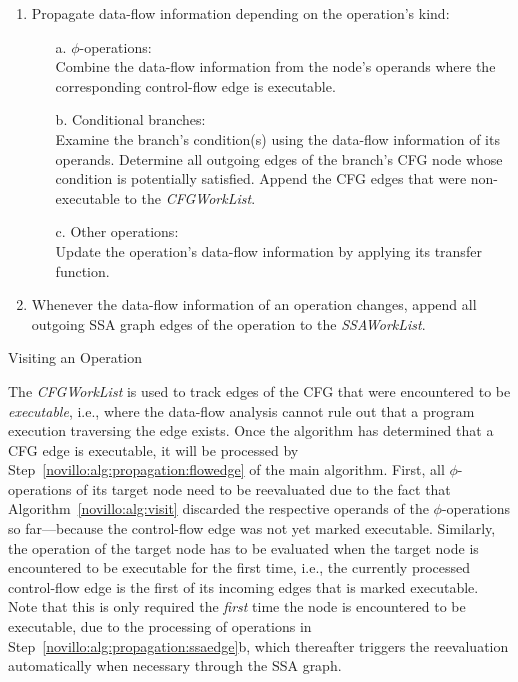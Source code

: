 \begin{algorithm}[t!]
  \begin{enumerate}
    \item Propagate data-flow information depending on the operation's kind:
    \begin{enumerate}
      \vspace{-1.2ex}
      \item[a.] \label{novillo:alg:visit:phi} $\phi$-operations: \\
                Combine the data-flow information from the node's operands where
                the corresponding control-flow edge is executable.
      \item[b.] \label{novillo:alg:visit:branch} Conditional branches: \\
                Examine the branch's condition(s) using the data-flow
                information of its operands. Determine all outgoing edges of the
                branch's CFG node whose condition is potentially satisfied.
                Append the CFG edges that were non-executable to the
                \emph{CFGWorkList}.
      \item[c.] \label{novillo:alg:visit:regular} Other operations:\\
                Update the operation's data-flow information by applying its 
                transfer function.
    \end{enumerate}
    \vspace{-1ex}
    \item Whenever the data-flow information of an operation changes, append all
          outgoing SSA graph edges of the operation to the \emph{SSAWorkList}.
  \end{enumerate}
  \caption{Visiting an Operation}
  \label{novillo:alg:visit}
\end{algorithm}

The \emph{CFGWorkList} is used to track edges of the CFG that were encountered
to be \emph{executable}, i.e., where the data-flow analysis cannot rule out that
a program execution traversing the edge exists. Once the algorithm has
determined that a CFG edge is executable, it will be processed by
Step~\ref{novillo:alg:propagation:flowedge} of the main algorithm. First, all
$\phi$-operations of its target node need to be reevaluated due to the fact that
Algorithm~\ref{novillo:alg:visit} discarded the respective operands of the
$\phi$-operations so far---because the control-flow edge was not yet marked
executable.
Similarly, the operation of the target node has to be evaluated when the target
node is encountered to be executable for the first time, i.e., the currently
processed control-flow edge is the first of its incoming edges that is marked
executable. Note that this is only required the \emph{first} time the node is
encountered to be executable, due to the processing of operations in
Step~\ref{novillo:alg:propagation:ssaedge}b, which thereafter triggers the
reevaluation automatically when necessary through the SSA graph.

